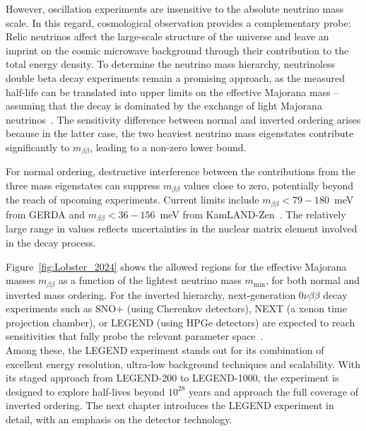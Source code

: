 However, oscillation experiments are insensitive to the absolute neutrino mass scale. In this regard, cosmological observation provides a complementary probe: Relic neutrinos affect the large-scale structure of the universe and leave an imprint on the cosmic microwave background through their contribution to the total energy density. 
To determine the neutrino mass hierarchy, neutrinoless double beta decay experiments remain a promising approach, as the measured half-life can be translated into upper limits on the effective Majorana mass -- assuming that the decay is dominated by the exchange of light Majorana neutrinos~\cite{gerda_collaboration_final_2020}.
The sensitivity difference between normal and inverted ordering arises because in the latter case, the two heaviest neutrino mass eigenstates contribute significantly to $m_{\beta \beta}$, leading to a non-zero lower bound. 

For normal ordering, destructive interference between the contributions from the three mass eigenstates can suppress $m_{\beta \beta}$ values close to zero, potentially beyond the reach of upcoming experiments. 
Current limits include $m_{\beta \beta} < 79-180$~meV from GERDA and $m_{\beta \beta} < 36-156$~meV from KamLAND-Zen~\cite{gerda_collaboration_final_2020, abbasi_measurement_2023}. The relatively large range in values reflects uncertainties in the nuclear matrix element involved in the decay process.  

Figure~\ref{fig:Lobster_2024} shows the allowed regions for the effective Majorana masses $m_{\beta \beta}$ as a function of the lightest neutrino mass $m_{\mathrm{min}}$, for both normal and inverted mass ordering. For the inverted hierarchy, next-generation $0 \nu \beta \beta$ decay experiments such as SNO$+$ (using Cherenkov detectors), NEXT (a xenon time projection chamber), or LEGEND (using HPGe detectors) are expected to reach sensitivities that fully probe the relevant parameter space~\cite{agostini_discovery_2017}. \\
Among these, the LEGEND experiment stands out for its combination of excellent energy resolution, ultra-low background techniques and scalability. With its staged approach from LEGEND-200 to LEGEND-1000, the experiment is designed to explore half-lives beyond $10^{28}$ years and approach the full coverage of inverted ordering. 
The next chapter introduces the LEGEND experiment in detail, with an emphasis on the detector technology. 

